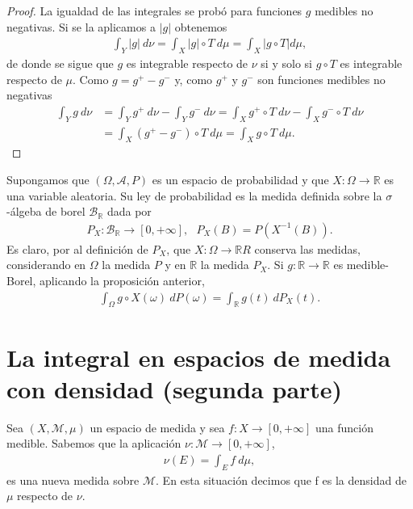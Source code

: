 \begin{proof}
    La igualdad de las integrales se probó para funciones $g$ medibles no negativas. Si se la aplicamos a $|g|$ obtenemos
    \begin{align*}
        \int_{Y}{|g| \ d\nu} = \int_{X}{|g|\circ T \ d\mu} = \int_{X}{|g \circ T| d\mu},
    \end{align*}
    de donde se sigue que $g$ es integrable respecto de $\nu$ si y solo si $g \circ T$ es integrable respecto de $\mu$. Como $g = g^+ - g^-$ y, como $g^+$ y $g^-$ son funciones medibles no negativas
    \begin{align*}
        \int_{Y}{g \ d\nu} & = \int_{Y}{g^+ \ d\nu} - \int_{Y}{g^- \ d\nu} = \int_{X}{g^+ \circ T \ d\nu} - \int_{X}{g^- \circ T \ d\nu} \\
                           & = \int_{X}{(g^+ - g^-) \circ T \ d\mu} = \int_{X}{g \circ T \ d\mu}.
    \end{align*}
\end{proof}

\begin{ejemplo}
    Supongamos que $(\Omega, \mathcal{A}, P)$ es un espacio de probabilidad y que $X: \Omega \longrightarrow \mathbb{R}$ es una variable aleatoria. Su ley de probabilidad es la medida definida sobre la $\sigma$-álgeba de borel $\mathcal{B}_{\mathbb{R}}$ dada por
    \begin{align*}
        P_X: \mathcal{B}_{\mathbb{R}} \longrightarrow [0,+\infty], \ \ \ P_X(B) = P(X^{-1}(B)).
    \end{align*}
    Es claro, por al definición de $P_X$, que $X: \Omega \longrightarrow \mathbb{R}R$ conserva las medidas, considerando en $\Omega$ la medida $P$ y en $\mathbb{R}$ la medida $P_X$. Si $g: \mathbb{R} \longrightarrow \mathbb{R}$ es medible-Borel, aplicando la proposición anterior,
    \begin{align*}
        \int_{\Omega}{g \circ X(\omega) \ dP(\omega)} = \int_{\mathbb{R}}{g(t) \ dP_X(t)}.
    \end{align*}
\end{ejemplo}

\section{La integral en espacios de medida con densidad (segunda parte)}
Sea $(X, \mathcal{M},\mu)$ un espacio de medida y sea $f: X \longrightarrow [0,+\infty]$ una función medible. Sabemos que la aplicación $\nu: \mathcal{M} \longrightarrow [0,+\infty]$,
\begin{align*}
    \nu(E) = \int_{E}{f \ d\mu},
\end{align*}
es una nueva medida sobre $\mathcal{M}$. En esta situación decimos que f es la densidad de $\mu$ respecto de $\nu$.

